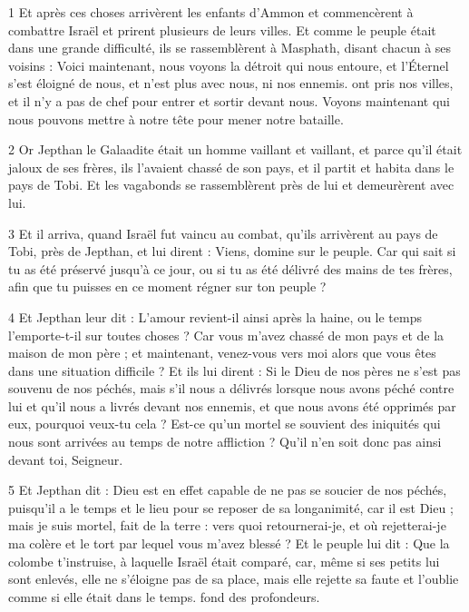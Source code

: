 
\par 1 Et après ces choses arrivèrent les enfants d'Ammon et commencèrent à combattre Israël et prirent plusieurs de leurs villes. Et comme le peuple était dans une grande difficulté, ils se rassemblèrent à Masphath, disant chacun à ses voisins : Voici maintenant, nous voyons la détroit qui nous entoure, et l'Éternel s'est éloigné de nous, et n'est plus avec nous, ni nos ennemis. ont pris nos villes, et il n'y a pas de chef pour entrer et sortir devant nous. Voyons maintenant qui nous pouvons mettre à notre tête pour mener notre bataille.

\par 2 Or Jepthan le Galaadite était un homme vaillant et vaillant, et parce qu'il était jaloux de ses frères, ils l'avaient chassé de son pays, et il partit et habita dans le pays de Tobi. Et les vagabonds se rassemblèrent près de lui et demeurèrent avec lui.

\par 3 Et il arriva, quand Israël fut vaincu au combat, qu'ils arrivèrent au pays de Tobi, près de Jepthan, et lui dirent : Viens, domine sur le peuple. Car qui sait si tu as été préservé jusqu'à ce jour, ou si tu as été délivré des mains de tes frères, afin que tu puisses en ce moment régner sur ton peuple ?

\par 4 Et Jepthan leur dit : L'amour revient-il ainsi après la haine, ou le temps l'emporte-t-il sur toutes choses ? Car vous m'avez chassé de mon pays et de la maison de mon père ; et maintenant, venez-vous vers moi alors que vous êtes dans une situation difficile ? Et ils lui dirent : Si le Dieu de nos pères ne s'est pas souvenu de nos péchés, mais s'il nous a délivrés lorsque nous avons péché contre lui et qu'il nous a livrés devant nos ennemis, et que nous avons été opprimés par eux, pourquoi veux-tu cela ? Est-ce qu'un mortel se souvient des iniquités qui nous sont arrivées au temps de notre affliction ? Qu’il n’en soit donc pas ainsi devant toi, Seigneur.

\par 5 Et Jepthan dit : Dieu est en effet capable de ne pas se soucier de nos péchés, puisqu'il a le temps et le lieu pour se reposer de sa longanimité, car il est Dieu ; mais je suis mortel, fait de la terre : vers quoi retournerai-je, et où rejetterai-je ma colère et le tort par lequel vous m'avez blessé ? Et le peuple lui dit : Que la colombe t'instruise, à laquelle Israël était comparé, car, même si ses petits lui sont enlevés, elle ne s'éloigne pas de sa place, mais elle rejette sa faute et l'oublie comme si elle était dans le temps. fond des profondeurs.

